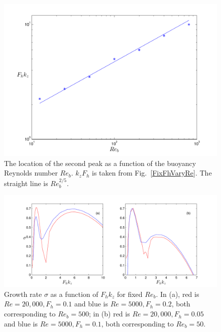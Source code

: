 
\begin{figure}
\begin{center}
\includegraphics[scale=0.65]{second_peak_buoyancy}
\caption{The location of the second peak as a function of the buoyancy Reynolds number $Re_{b}$. $k_{z}F_{h}$ is taken from Fig.~\ref{FixFhVaryRe}. The straight line is $Re_{b}^{2/5}$.}
\label{Buoy}
\end{center}
\end{figure}
\begin{figure}
\begin{center}
\includegraphics[scale=0.65]{buoyancy_reynolds}
\caption{Growth rate $\sigma$ as a function of $F_{h}k_{z}$ for fixed $Re_{b}$. In (a), red is $Re=20{,}000, F_{h}=0.1$ and blue is $Re=5000, F_{h}=0.2$, both corresponding to $Re_{b}=500$; in (b) red is $Re=20{,}000, F_{h}=0.05$ and blue is $Re=5000, F_{h}=0.1$, both corresponding to $Re_{b}=50$.}
\label{ReBuoy}
\end{center}
\end{figure}


